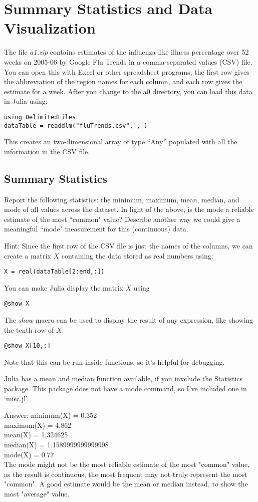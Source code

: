 \documentclass{article}
\def\ans#1{\par\gre{Answer: #1}}
\def\blu#1{{\color{blu}#1}}
\def\gre#1{{\color{gre}#1}}
\begin{document}
\section{Summary Statistics and Data Visualization}

The file \emph{a1.zip} contains estimates of the influenza-like illness percentage over 52 weeks on 2005-06 by Google Flu Trends in a comma-separated values (CSV) file. You can open this with Excel or other spreadsheet programs; the first row gives the abbreviation of the region names for each column, and each row gives the estimate for a week.
After you change to the a0 directory, you can load this data in Julia using:
\begin{verbatim}
using DelimitedFiles
dataTable = readdlm("fluTrends.csv",',')
\end{verbatim}
This creates an two-dimensional array of type ``Any''  populated with all the information in the CSV file.

\subsection{Summary Statistics}

\blu{Report the following statistics}: the minimum, maximum, mean, median, and mode of all values across the dataset. In light of the above, \blu{is the mode a reliable estimate of the most ``common" value? Describe another way we could give a meaningful ``mode" measurement for this (continuous) data.}

Hint: Since the first row of the CSV file is just the names of the columns, we can create a matrix $X$ containing the data stored as real numbers using:
\begin{verbatim}
X = real(dataTable[2:end,:])
\end{verbatim}
You can make Julia display the matrix $X$ using
\begin{verbatim}
@show X
\end{verbatim}
The \emph{show} macro can be used to display the result of any expression, like showing the tenth row of $X$:
\begin{verbatim}
@show X[10,:]
\end{verbatim}
Note that this can be run inside functions, so it's helpful for debugging.

Julia has a mean and median function available, if you inxclude the Statistics package. This package does not have a mode command, so I've included one in `misc.jl'.

\ans{minimum(X) = 0.352\\
maximum(X) = 4.862\\
mean(X) = 1.324625\\
median(X) = 1.1589999999999998\\
mode(X) = 0.77\\
The mode might not be the most reliable estimate of the most "common" value, as the result is continuous, the most frequent may not truly represent the most "common". A good estimate would be the mean or median instead, to show the most "average" value.}
\end{document}
